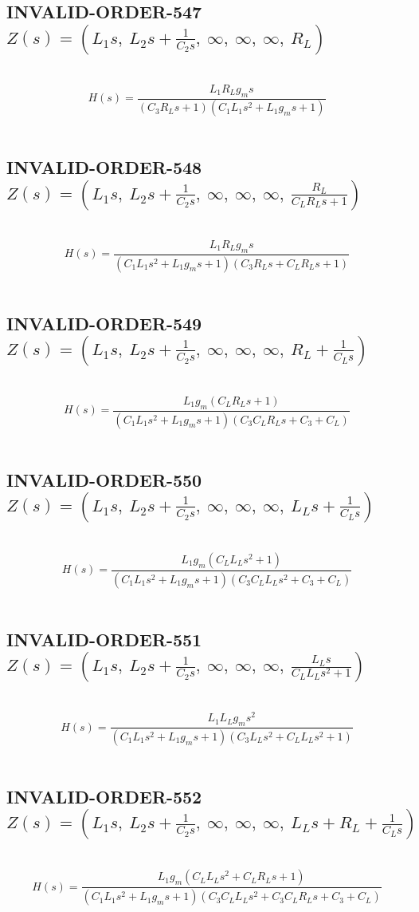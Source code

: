 \documentclass{article}
\begin{document}
\subsection{INVALID-ORDER-547 $Z(s) = \left( L_{1} s, \  L_{2} s + \frac{1}{C_{2} s}, \  \infty, \  \infty, \  \infty, \  R_{L}\right)$ } \ 
\textbf{\[H(s) = \frac{L_{1} R_{L} g_{m} s}{\left(C_{3} R_{L} s + 1\right) \left(C_{1} L_{1} s^{2} + L_{1} g_{m} s + 1\right)}\] } \ 
\subsection{INVALID-ORDER-548 $Z(s) = \left( L_{1} s, \  L_{2} s + \frac{1}{C_{2} s}, \  \infty, \  \infty, \  \infty, \  \frac{R_{L}}{C_{L} R_{L} s + 1}\right)$ } \ 
\textbf{\[H(s) = \frac{L_{1} R_{L} g_{m} s}{\left(C_{1} L_{1} s^{2} + L_{1} g_{m} s + 1\right) \left(C_{3} R_{L} s + C_{L} R_{L} s + 1\right)}\] } \ 
\subsection{INVALID-ORDER-549 $Z(s) = \left( L_{1} s, \  L_{2} s + \frac{1}{C_{2} s}, \  \infty, \  \infty, \  \infty, \  R_{L} + \frac{1}{C_{L} s}\right)$ } \ 
\textbf{\[H(s) = \frac{L_{1} g_{m} \left(C_{L} R_{L} s + 1\right)}{\left(C_{1} L_{1} s^{2} + L_{1} g_{m} s + 1\right) \left(C_{3} C_{L} R_{L} s + C_{3} + C_{L}\right)}\] } \ 
\subsection{INVALID-ORDER-550 $Z(s) = \left( L_{1} s, \  L_{2} s + \frac{1}{C_{2} s}, \  \infty, \  \infty, \  \infty, \  L_{L} s + \frac{1}{C_{L} s}\right)$ } \ 
\textbf{\[H(s) = \frac{L_{1} g_{m} \left(C_{L} L_{L} s^{2} + 1\right)}{\left(C_{1} L_{1} s^{2} + L_{1} g_{m} s + 1\right) \left(C_{3} C_{L} L_{L} s^{2} + C_{3} + C_{L}\right)}\] } \ 
\subsection{INVALID-ORDER-551 $Z(s) = \left( L_{1} s, \  L_{2} s + \frac{1}{C_{2} s}, \  \infty, \  \infty, \  \infty, \  \frac{L_{L} s}{C_{L} L_{L} s^{2} + 1}\right)$ } \ 
\textbf{\[H(s) = \frac{L_{1} L_{L} g_{m} s^{2}}{\left(C_{1} L_{1} s^{2} + L_{1} g_{m} s + 1\right) \left(C_{3} L_{L} s^{2} + C_{L} L_{L} s^{2} + 1\right)}\] } \ 
\subsection{INVALID-ORDER-552 $Z(s) = \left( L_{1} s, \  L_{2} s + \frac{1}{C_{2} s}, \  \infty, \  \infty, \  \infty, \  L_{L} s + R_{L} + \frac{1}{C_{L} s}\right)$ } \ 
\textbf{\[H(s) = \frac{L_{1} g_{m} \left(C_{L} L_{L} s^{2} + C_{L} R_{L} s + 1\right)}{\left(C_{1} L_{1} s^{2} + L_{1} g_{m} s + 1\right) \left(C_{3} C_{L} L_{L} s^{2} + C_{3} C_{L} R_{L} s + C_{3} + C_{L}\right)}\] } \ 
\end{document}
